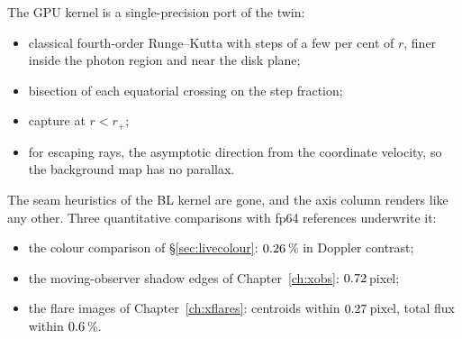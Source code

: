 The GPU kernel is a single-precision port of the twin:
\begin{itemize}
\item classical fourth-order Runge--Kutta with steps of a few per cent of
$r$, finer inside the photon region and near the disk plane;
\item bisection of each equatorial crossing on the step fraction;
\item capture at $r < r_+$;
\item for escaping rays, the asymptotic direction from the coordinate
velocity, so the background map has no parallax.
\end{itemize}
The seam heuristics of the BL kernel are gone, and the axis column renders
like any other. Three quantitative comparisons with fp64 references
underwrite it:
\begin{itemize}
\item the colour comparison of \S\ref{sec:livecolour}: $0.26$\,\%
in Doppler contrast;
\item the moving-observer shadow edges of Chapter~\ref{ch:xobs}:
$0.72$\,pixel;
\item the flare images of Chapter~\ref{ch:xflares}: centroids within
$0.27$\,pixel, total flux within $0.6$\,\%.
\end{itemize}
